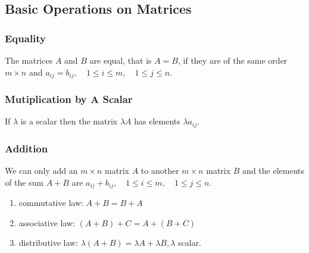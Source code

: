 \documentclass[12pt,a4paper,fleqn]{mycalc}
\begin{document}
	\subsection{Basic Operations on Matrices}
	\subsubsection{Equality}
	The matrices \( A \) and \( B \) are equal, that is \( A = B \), if they are of the same order \( m \times n \) and \( a_{ij}=b_{ij},\quad 1\leq i\leq m,\quad 1\leq j\leq n. \)
	\subsubsection{Mutiplication by A Scalar}
	If \( \lambda \) is a scalar then the matrix \( \lambda A \) has elements \( \lambda a_{ij}. \)
	\subsubsection{Addition}
	We can only add an \( m \times n \) matrix \( A \) to another \( m \times n \) matrix \( B \) and the elements of the sum \( A + B \) are
	\( a_{ij} + b_{ij},\quad 1 \leq i \leq m,\quad 1 \leq j \leq n. \)
	\begin{tcolorbox}[title={Properties of Addition}]
		\begin{enumerate}[i]
			\item commutative law: \( A + B = B + A \)
			\item associative law: \( (A + B) + C = A + (B + C) \)
			\item distributive law: \( \lambda (A + B) = \lambda A + \lambda B, \lambda \) scalar.
		\end{enumerate}
	\end{tcolorbox}
\end{document}

